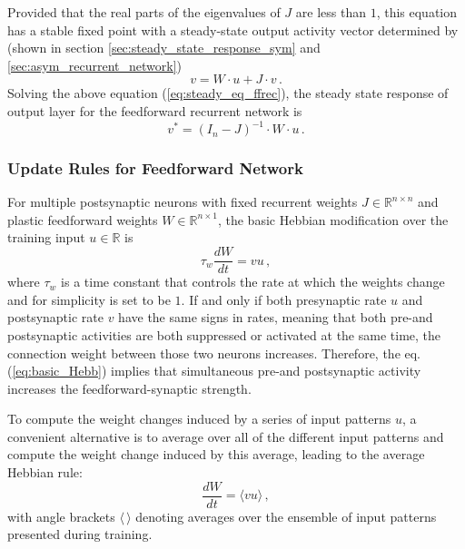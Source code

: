 \documentclass[11pt]{article}
\begin{document}
	Provided that the real parts of the eigenvalues of $J$ are less than $1$, this equation has a stable fixed point with a steady-state output activity vector determined by (shown in section \ref{sec:steady_state_response_sym} and \ref{sec:asym_recurrent_network})
		\begin{equation} \label{eq:steady_eq_ffrec}
			v = W \cdot u + J \cdot v \, .
		\end{equation}
	Solving the above equation (\ref{eq:steady_eq_ffrec}), the steady state response of output layer for the feedforward recurrent network is
		\begin{equation} \label{eq:steady_state_ffrec}
			v^* = (I_n - J)^{-1} \cdot W \cdot u \, .
		\end{equation}
	
	\subsubsection{Update Rules for Feedforward Network}
	For multiple postsynaptic neurons with fixed recurrent weights $J \in \mathbb{R}^{n \times n}$ and plastic feedforward weights $W \in \mathbb{R}^{n \times 1}$, the basic Hebbian modification over the training input $u \in \mathbb{R}$ is 
		\begin{equation} \label{eq:basic_Hebb}
			\tau_w \frac{dW}{dt} = vu \, , 
		\end{equation}
	where $\tau_w$ is a time constant that controls the rate at which the weights change and for simplicity is set to be $1$. If and only if both presynaptic rate $u$ and postsynaptic rate $v$ have the same signs in rates, meaning that both pre-and postsynaptic activities are both suppressed or activated at the same time, the connection weight between those two neurons increases. Therefore, the eq.(\ref{eq:basic_Hebb}) implies that simultaneous pre-and postsynaptic activity increases the feedforward-synaptic strength.
	
	To compute the weight changes induced by a series of input patterns $u$, a convenient alternative is to average over all of the different input patterns and compute the weight change induced by this average, leading to the average Hebbian rule:
		\begin{equation} \label{eq:average_Hebb}
			\frac{dW}{dt} = \langle vu \rangle \, ,
		\end{equation}
	with angle brackets $\langle \, \rangle$ denoting averages over the ensemble of input patterns presented during training. 
	
\end{document}
